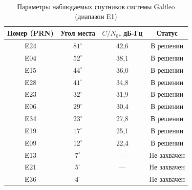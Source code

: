 \begin{table}[H]
    \centering
    \small
    \caption{Параметры наблюдаемых спутников системы Galileo (диапазон E1)}
    \label{tab:gal_details}
    \begin{tabular}{|c|c|c|c|}
        \hline
        Номер (PRN) & Угол места & $C/N_0$, дБ-Гц & Статус \\
        \hline
        E24 & $81^\circ$ & 42,6 & В решении \\
        \hline
        E04 & $52^\circ$ & 38,1 & В решении \\
        \hline
        E15 & $44^\circ$ & 36,0 & В решении \\
        \hline
        E28 & $41^\circ$ & 34,8 & В решении \\
        \hline
        E23 & $32^\circ$ & 31,9 & В решении \\
        \hline
        E06 & $29^\circ$ & 30,4 & В решении \\
        \hline
        E34 & $23^\circ$ & 27,8 & В решении \\
        \hline
        E19 & $17^\circ$ & 25,1 & В решении \\
        \hline
        E09 & $12^\circ$ & 22,4 & В решении \\
        \hline
        E13 & $7^\circ$ & --- & Не захвачен \\
        \hline
        E21 & $5^\circ$ & --- & Не захвачен \\
        \hline
        E36 & $4^\circ$ & --- & Не захвачен \\
        \hline
    \end{tabular}
\end{table}

